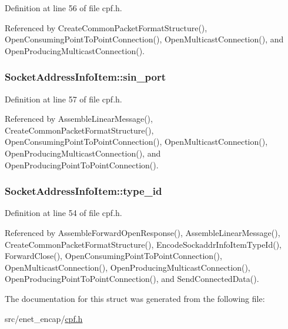 \-Definition at line 56 of file cpf.\-h.



\-Referenced by \-Create\-Common\-Packet\-Format\-Structure(), \-Open\-Consuming\-Point\-To\-Point\-Connection(), \-Open\-Multicast\-Connection(), and \-Open\-Producing\-Multicast\-Connection().

\hypertarget{structSocketAddressInfoItem_a3f7a4600643a87742112758468b42146}{
\subsubsection[{sin\-\_\-port}]{ {\bf \-Socket\-Address\-Info\-Item\-::sin\-\_\-port}}}\label{dc/d3c/structSocketAddressInfoItem_a3f7a4600643a87742112758468b42146}


\-Definition at line 57 of file cpf.\-h.



\-Referenced by \-Assemble\-Linear\-Message(), \-Create\-Common\-Packet\-Format\-Structure(), \-Open\-Consuming\-Point\-To\-Point\-Connection(), \-Open\-Multicast\-Connection(), \-Open\-Producing\-Multicast\-Connection(), and \-Open\-Producing\-Point\-To\-Point\-Connection().

\hypertarget{structSocketAddressInfoItem_ad71289b55ab0ff6a4382af44afaccca2}{
\subsubsection[{type\-\_\-id}]{ {\bf \-Socket\-Address\-Info\-Item\-::type\-\_\-id}}}\label{dc/d3c/structSocketAddressInfoItem_ad71289b55ab0ff6a4382af44afaccca2}


\-Definition at line 54 of file cpf.\-h.



\-Referenced by \-Assemble\-Forward\-Open\-Response(), \-Assemble\-Linear\-Message(), \-Create\-Common\-Packet\-Format\-Structure(), \-Encode\-Sockaddr\-Info\-Item\-Type\-Id(), \-Forward\-Close(), \-Open\-Consuming\-Point\-To\-Point\-Connection(), \-Open\-Multicast\-Connection(), \-Open\-Producing\-Multicast\-Connection(), \-Open\-Producing\-Point\-To\-Point\-Connection(), and \-Send\-Connected\-Data().



\-The documentation for this struct was generated from the following file\-:\begin{DoxyCompactItemize}
\item 
src/enet\-\_\-encap/\hyperlink{cpf_8h}{cpf.\-h}\end{DoxyCompactItemize}
